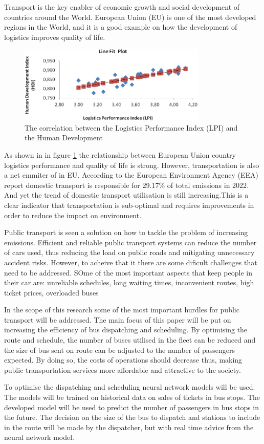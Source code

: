 \hspace{1em} Transport is the key enabler of economic growth and social development 
of countries around the World. European Union (EU) is one of the most developed regions in the World, 
and it is a good example on how the development of logistics improves quality of life. 
\begin{figure}[h]
    \centering
    \includegraphics[width=0.8\textwidth]{figures/correlation_HDI_LPI.png}
    \caption{The correlation between the Logistics Performance Index (LPI) and the Human Development\cite{HDIvsLPI}}
    \label{fig:correlation_HDI_LPI}
\end{figure}


As shown in in figure \ref{fig:correlation_HDI_LPI} the relationship between European Union country 
logistics performance and quality of life is strong. However, transportation is also 
a net emmiter of  in EU. According to the European Environment Agency (EEA) report domestic
transport is responsible for 29.17\% of total  emissions in 2022\cite{EEA}. And yet the trend of 
domestic transport utilisation is still increasing.This is a clear indicator that transportation is sub-optimal and requires
 improvements in order to reduce the impact on environment. 

Public transport is seen a solution on how to tackle the problem of increasing  emissions.
Efficient and reliable public transport systems can reduce the number of cars used, thus reducing 
the load on public roads and mitigating unnecessary accident risks. However, to acheive that
it there are some dificult challenges that need to be addressed. SOme of the most important aspects
that keep people in their car are:
    unreliable schedules,
    long waiting times,
    inconvenient routes,
    high ticket prices,
    overloaded buses

In the scope of this research some of the most important hurdles for public transport will be addressed.
The main focus of this paper will be put on increasing the efficiency of bus dispatching and scheduling.
By optimising the route and schedule, the number of buses utilised in the fleet can be reduced and 
the size of bus sent on route can be adjusted to the number of passengers expected. 
By doing so, the costs of operations should decrease thus, making public transportation services more
affordable and attractive to the society.

To optimise the dispatching and scheduling neural network models will be used. The models will
be trained on historical data on sales of tickets in bus stops. The developed model will be
used to predict the number of passengers in bus stops in the future. The decision on the size of the bus
to dispatch and stations to include in the route will be made by the dispatcher, but with real time
advice from the neural network model. 
